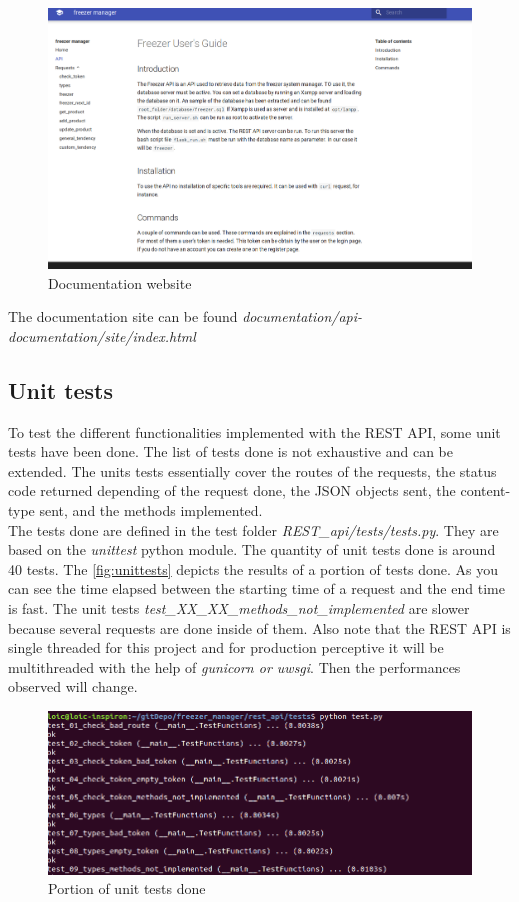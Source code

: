 \begin{figure}[H]
\centering
\includegraphics[scale=0.25]{./images/documentation.png}
\caption{Documentation website}
\label{fig:adminPanel}
\end{figure}

The documentation site can be found \textit{documentation/api-documentation/site/index.html}

\subsection{Unit tests}
To test the different functionalities implemented with the REST API, some unit tests have been done. The list of tests done is not exhaustive and can be extended. The units tests essentially cover the routes of the requests, the status code returned depending of the request done, the JSON objects sent, the content-type sent, and the methods implemented.\\

The tests done are defined in the test folder \textit{REST\_api/tests/tests.py}. They are based on the \textit{unittest} python module. The quantity of unit tests done is around 40 tests. The \autoref{fig:unittests} depicts the results of a portion of tests done. As you can see the time elapsed between the starting time of a request and the end time is fast. The unit tests \textit{test\_XX\_XX\_methods\_not\_implemented} are slower because several requests are done inside of them. Also note that the REST API is single threaded for this project and for production perceptive it will be multithreaded with the help of \textit{gunicorn or uwsgi}. Then the performances observed will change.
\begin{figure}[H]
\centering
\includegraphics[scale=0.4]{./images/unittests.png}
\caption{Portion of unit tests done}
\label{fig:unittests}
\end{figure}

